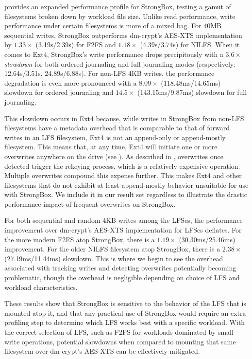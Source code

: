  provides an expanded performance profile for
StrongBox, testing a gamut of filesystems broken down by workload file size.
Unlike read performance, write performance under certain filesystems is more of
a mixed bag. For 40MB sequential writes, StrongBox outperforms dm-crypt's
AES-XTS implementation by $1.33\times$ (3.19s/2.39s) for F2FS and $1.18\times$
(4.39s/3.74s) for NILFS\@. When it comes to Ext4, StrongBox's write performance
drops precipitously with a $3.6\times$ \textit{slowdown} for both ordered
journaling and full journaling modes (respectively: 12.64s/3.51s, 24.89s/6.88s).
For non-LFS 4KB writes, the performance degradation is even more pronounced with
a $8.09\times$ (118.48ms/14.65ms) slowdown for ordered journaling and
$14.5\times$ (143.15ms/9.87ms) slowdown for full journaling.

This slowdown occurs in Ext4 because, while writes in StrongBox from non-LFS
filesystems have a metadata overhead that is comparable to that of forward
writes in an LFS filesystem, Ext4 is not an append-only or append-mostly
filesystem. This means that, at any time, Ext4 will initiate one or more
overwrites anywhere on the drive (see ). As described in
, overwrites once detected trigger the rekeying process, which is
a relatively expensive operation. Multiple overwrites compound this expense
further. This makes Ext4 and other filesystems that do not exhibit at least
append-mostly behavior unsuitable for use with StrongBox. We include it in our
result set regardless to illustrate the drastic performance impact of frequent
overwrites on StrongBox.

For both sequential and random 4KB writes among the LFSes, the performance
improvement over dm-crypt's AES-XTS implementation for LFSes deflates. For the
more modern F2FS atop StrongBox, there is a $1.19\times$ (30.30ms/25.46ms)
improvement. For the older NILFS filesystem atop StrongBox, there is a
$2.38\times$ (27.19ms/11.44ms) slowdown. This is where we begin to see the
overhead associated with tracking writes and detecting overwrites potentially
becoming problematic, though the overhead is negligible depending on choice of
LFS and workload characteristics.

These results show that StrongBox is sensitive to the behavior of the LFS that
is mounted atop it, and that any practical use of StrongBox would require an
extra profiling step to determine which LFS works best with a specific workload.
With the correct selection of LFS, such as F2FS for workloads dominated by small
write operations, potential slowdowns when compared to mounting that same
filesystem over dm-crypt's AES-XTS can be effectively mitigated.

